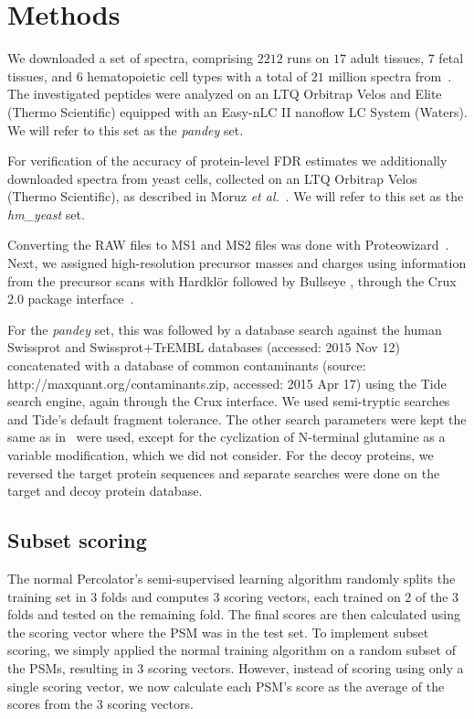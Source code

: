 \documentclass{article}
\begin{document}
\section*{Methods}

We downloaded a set of spectra, comprising $2212$ runs on $17$ adult
tissues, $7$ fetal tissues, and $6$ hematopoietic cell types with a
total of $21$ million spectra from~\cite{kim2014draft}. The
investigated peptides were analyzed on an LTQ Orbitrap Velos and Elite
(Thermo Scientific) equipped with an Easy-nLC II nanoflow LC System
(Waters). We will refer to this set as the {\em pandey} set.

For verification of the accuracy of protein-level FDR estimates we
additionally downloaded spectra from yeast cells, collected on an LTQ
Orbitrap Velos (Thermo Scientific), as described in Moruz {\em et 
al.}~\cite{moruz2013}. We will refer to this set as the {\em
hm\_yeast} set.

Converting the RAW files to MS1 and MS2 files was done with
Proteowizard~\cite{kessner2008}. Next, we assigned high-resolution
precursor masses and charges using information from the precursor
scans with Hardkl\"{o}r \cite{hoopmann2007} followed by Bullseye
\cite{hsieh2009}, through the Crux 2.0 package
interface~\cite{mcilwain2014}. 

For the {\em pandey} set, this was followed by a database search
against the human Swissprot and Swissprot+TrEMBL databases (accessed:
2015 Nov 12) concatenated with a database of common contaminants
(source: http://maxquant.org/contaminants.zip, accessed: 2015 Apr 17)
using the Tide search engine, again through the Crux interface. We
used semi-tryptic searches and Tide's default fragment tolerance. The
other search parameters were kept the same as in~\cite{kim2014draft}
were used, except for the cyclization of N-terminal glutamine as a
variable modification, which we did not consider. For the decoy
proteins, we reversed the target protein sequences and separate
searches were done on the target and decoy protein database.

\subsection*{Subset scoring}

The normal Percolator's semi-supervised learning algorithm randomly
splits the training set in $3$ folds and computes $3$ scoring vectors,
each trained on $2$ of the $3$ folds and tested on the remaining
fold. The final scores are then calculated using the scoring vector
where the PSM was in the test set. To implement subset scoring, we
simply applied the normal training algorithm on a random subset of the
PSMs, resulting in $3$ scoring vectors. However, instead
of scoring using only a single scoring vector, we now calculate each
PSM's score as the average of the scores from the $3$ scoring vectors.
\end{document}
